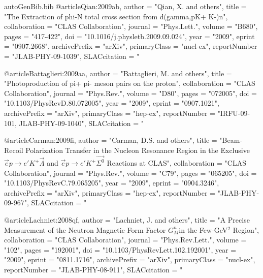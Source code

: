 \begin{filecontents*}{autoGenBib.bib}
@article{Qian:2009ab,
      author         = "Qian, X. and others",
      title          = "{The Extraction of phi-N total cross section from d(gamma,pK+ K-)n}",
      collaboration  = "CLAS Collaboration",
      journal        = "Phys.Lett.",
      volume         = "B680",
      pages          = "417-422",
      doi            = "10.1016/j.physletb.2009.09.024",
      year           = "2009",
      eprint         = "0907.2668",
      archivePrefix  = "arXiv",
      primaryClass   = "nucl-ex",
      reportNumber   = "JLAB-PHY-09-1039",
      SLACcitation   = "%
}

@article{Battaglieri:2009aa,
      author         = "Battaglieri, M. and others",
      title          = "{Photoproduction of pi+ pi- meson pairs on the proton}",
      collaboration  = "CLAS Collaboration",
      journal        = "Phys.Rev.",
      volume         = "D80",
      pages          = "072005",
      doi            = "10.1103/PhysRevD.80.072005",
      year           = "2009",
      eprint         = "0907.1021",
      archivePrefix  = "arXiv",
      primaryClass   = "hep-ex",
      reportNumber   = "IRFU-09-101, JLAB-PHY-09-1040",
      SLACcitation   = "%
}

@article{Carman:2009fi,
      author         = "Carman, D.S. and others",
      title          = "{Beam-Recoil Polarization Transfer in the Nucleon
                        Resonance Region in the Exclusive $\vec{e}p \rightarrow e'K^+ \vec{\Lambda}$ and $\vec{e}p \rightarrow e'K^+ \vec{\Sigma^0}$
                        Reactions at CLAS}",
      collaboration  = "CLAS Collaboration",
      journal        = "Phys.Rev.",
      volume         = "C79",
      pages          = "065205",
      doi            = "10.1103/PhysRevC.79.065205",
      year           = "2009",
      eprint         = "0904.3246",
      archivePrefix  = "arXiv",
      primaryClass   = "hep-ex",
      reportNumber   = "JLAB-PHY-09-967",
      SLACcitation   = "%
}

@article{Lachniet:2008qf,
      author         = "Lachniet, J. and others",
      title          = "{A Precise Measurement of the Neutron Magnetic Form
                        Factor $G^n_M$in the Few-GeV$^2$ Region}",
      collaboration  = "CLAS Collaboration",
      journal        = "Phys.Rev.Lett.",
      volume         = "102",
      pages          = "192001",
      doi            = "10.1103/PhysRevLett.102.192001",
      year           = "2009",
      eprint         = "0811.1716",
      archivePrefix  = "arXiv",
      primaryClass   = "nucl-ex",
      reportNumber   = "JLAB-PHY-08-911",
      SLACcitation   = "%
}


\end{filecontents*}
